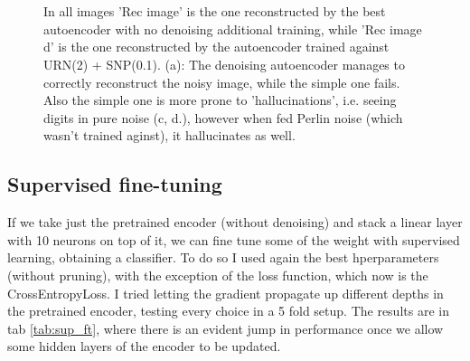 \documentclass[a4paper, 11pt]{article}
\begin{document}
    \begin{figure}
      \centering
       \,
       \\
       \,
      \caption{In all images 'Rec image' is the one reconstructed by the best autoencoder with no denoising additional training, while 'Rec image d' is the one reconstructed by the autoencoder trained against URN(2) + SNP(0.1). (a): The denoising autoencoder manages to correctly reconstruct the noisy image, while the simple one fails. Also the simple one is more prone to 'hallucinations', i.e. seeing digits in pure noise (c, d.), however when fed Perlin noise (which wasn't trained aginst), it hallucinates as well.}
      \label{fig:hallucination}
    \end{figure}

  \subsection{Supervised fine-tuning}
    If we take just the pretrained encoder (without denoising) and stack a linear layer with 10 neurons on top of it, we can fine tune some of the weight with supervised learning, obtaining a classifier. To do so I used again the best hperparameters (without pruning), with the exception of the loss function, which now is the CrossEntropyLoss. I tried letting the gradient propagate up different depths in the pretrained encoder, testing every choice in a 5 fold setup. The results are in tab \ref{tab:sup_ft}, where there is an evident jump in performance once we allow some hidden layers of the encoder to be updated.
\end{document}

